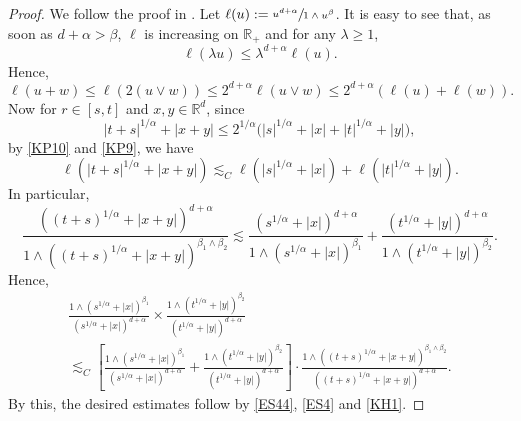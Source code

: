 \documentclass[11pt]{article}
\numberwithin{equation}{section}\providecommand{\asymp}{\mathrel{\sim}}
\theoremstyle{plain}
\theoremstyle{definition}
\newcommand\mR{\mathbb{R}}
\newcommand\1{{\mathbf{1}}}
\begin{document}
\begin{proof}
We follow the proof in \cite{Ch-Zh20}.
Let $\ell(u):=\sfrac{u^{d+\alpha}}{1\wedge u^{\beta}}$. It is easy to see that, as soon as $d+\alpha>\beta $, $\ell$ is increasing on $\mR_+$ and
for any $\lambda\geq 1$,
\begin{equation}\label{KP10}
\ell(\lambda u)\leq \lambda^{d+\alpha}\ell(u).
\end{equation}
Hence,\vspace*{-3pt}
\begin{equation}\label{KP9}
\ell(u+w)\leq \ell(2(u\vee w))\leq 2^{d+\alpha}\ell(u\vee w)\leq 2^{d+\alpha}(\ell(u)+\ell(w)).
\end{equation}
Now for $r\in[s,t]$ and $x,y\in\mR^d$, since
\[
|t+s|^{1/\alpha}+|x+y|\leq 2^{1/\alpha}\bigl(|s|^{1/\alpha}+|x|+|t|^{1/\alpha}+|y|\bigr),
\]
by \eqref{KP10} and \eqref{KP9}, we have
\begin{equation*}
\ell(|t+s|^{1/\alpha}+|x+y|)\lesssim_C\ell(|s|^{1/\alpha}+|x|)+\ell(|t|^{1/\alpha}+|y|).
\end{equation*}
In particular,
\begin{equation*}
\frac{((t+s)^{1/\alpha}+|x+y|)^{d+\alpha}}{1\wedge ((t+s)^{1/\alpha}+|x+y|)^{\beta_1\wedge\beta_2}}
\lesssim\frac{(s^{1/\alpha}+|x|)^{d+\alpha}}{1\wedge (s^{1/\alpha}+|x|)^{\beta_1}}
+\frac{(t^{1/\alpha}+|y|)^{d+\alpha}}{1\wedge (t^{1/\alpha}+|y|)^{\beta_2}}.
\end{equation*}
Hence,\vspace*{-3pt}
\begin{multline*}
\frac{1\wedge (s^{1/\alpha}+|x|)^{\beta_1}}{(s^{1/\alpha}+|x|)^{d+\alpha}}\times\frac{1\wedge (t^{1/\alpha}+|y|)^{\beta_2}}{(t^{1/\alpha}+|y|)^{d+\alpha}}\\
\lesssim_C\left[\frac{1\wedge (s^{1/\alpha}+|x|)^{\beta_1}}{(s^{1/\alpha}+|x|)^{d+\alpha}}
+\frac{1\wedge (t^{1/\alpha}+|y|)^{\beta_2}}{(t^{1/\alpha}+|y|)^{d+\alpha}}\right]\cdot\frac{1\wedge ((t+s)^{1/\alpha}+|x+y|)^{\beta_1\wedge\beta_2}}{((t+s)^{1/\alpha}+|x+y|)^{d+\alpha}}.
\end{multline*}
By this, the desired estimates follow by \eqref{ES44}, \eqref{ES4} and \eqref{KH1}.
\end{proof}
\end{document}

